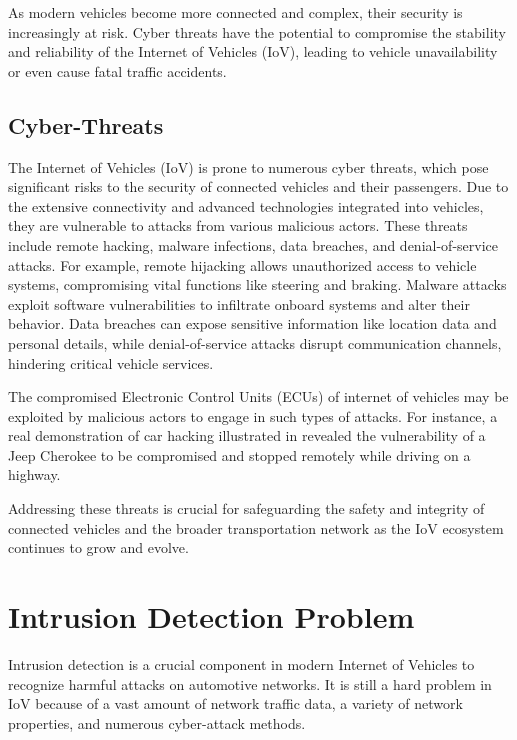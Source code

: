 {\par As modern vehicles become more connected and complex, their security is increasingly at risk. Cyber threats have the potential to compromise the stability and reliability of the Internet of Vehicles (IoV), leading to vehicle unavailability or even cause fatal traffic accidents.

\subsection{Cyber-Threats}
{

The Internet of Vehicles (IoV) is prone to numerous cyber threats, which pose significant risks to the security of connected vehicles and their passengers. Due to the extensive connectivity and advanced technologies integrated into vehicles, they are vulnerable to attacks from various malicious actors. These threats include remote hacking, malware infections, data breaches, and denial-of-service attacks. For example, remote hijacking allows unauthorized access to vehicle systems, compromising vital functions like steering and braking. Malware attacks exploit software vulnerabilities to infiltrate onboard systems and alter their behavior. Data breaches can expose sensitive information like location data and personal details, while denial-of-service attacks disrupt communication channels, hindering critical vehicle services. 

The compromised Electronic Control Units (ECUs) of internet of vehicles may be exploited by malicious actors to engage in such types of attacks. For instance, a real demonstration of car hacking illustrated in \cite{miller2015remote} revealed the vulnerability of a Jeep Cherokee to be compromised and stopped remotely while driving on a highway.

Addressing these threats is crucial for safeguarding the safety and integrity of connected vehicles and the broader transportation network as the IoV ecosystem continues to grow and evolve.


}

}


\section{Intrusion Detection Problem}
{
Intrusion detection is a crucial component in modern Internet of Vehicles to recognize harmful attacks on automotive networks. It is still a hard problem in IoV because of a vast amount of network traffic data, a variety of network properties, and numerous cyber-attack methods.

}

